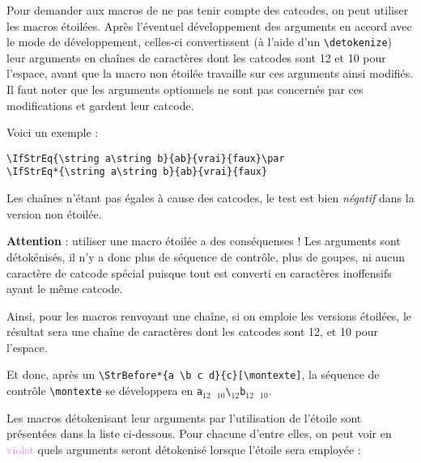 \documentclass[a4paper,10pt]{article}
\newcommand\guill[1]{\og{}#1\fg{}}
\newcommand\styleexercice{\footnotesize}
\newcommand\verbinline{\lstinline[basicstyle=\normalsize\ttfamily]}
\begin{document}
Pour demander aux macros de ne pas tenir compte des catcodes, on peut utiliser les macros étoilées. Après l'éventuel développement des arguments en accord avec le mode de développement, celles-ci convertissent (à l'aide d'un \verb|\detokenize|) leur arguments en chaînes de caractères dont les catcodes sont 12 et 10 pour l'espace, avant que la macro non étoilée travaille sur ces arguments ainsi modifiés. Il faut noter que les arguments optionnels ne sont pas concernés par ces modifications et gardent leur catcode.\smallskip

Voici un exemple :\par\nobreak\smallskip
\begin{minipage}[c]{0.65\linewidth}
\begin{lstlisting}
\IfStrEq{\string a\string b}{ab}{vrai}{faux}\par
\IfStrEq*{\string a\string b}{ab}{vrai}{faux}
\end{lstlisting}%
\end{minipage}\hfill
\begin{minipage}[c]{0.35\linewidth}
	\styleexercice
	\par
\end{minipage}%
\smallskip

Les chaînes n'étant pas égales à cause des catcodes, le test est bien \emph{négatif} dans la version non étoilée.\bigskip

\textbf{Attention} : utiliser une macro étoilée a des conséquenses ! Les arguments sont \guill{détokénisés}, il n'y a donc plus de séquence de contrôle, plus de goupes, ni aucun caractère de catcode spécial puisque tout est converti en caractères \guill{inoffensifs} ayant le même catcode.\medskip

Ainsi, pour les macros renvoyant une chaîne, si on emploie les versions étoilées, le résultat sera une chaîne de caractères dont les catcodes sont 12, et 10 pour l'espace.

Et donc, après un \og\verbinline|\StrBefore*{a \b c d}{c}[\montexte]|\fg{}, la séquence de contrôle \verb|\montexte| se développera en \og{}\verb|a|${}_{12}$\verb*| |${}_{10}$\verb|\|${}_{12}$\verb|b|${}_{12}$\verb*| |${}_{10}$\fg{}.\medskip

Les macros détokenisant leur arguments par l'utilisation de l'étoile sont présentées dans la liste ci-dessous. Pour chacune d'entre elles, on peut voir en \textcolor{violet}{violet} quels arguments seront détokenisé lorsque l'étoile sera employée :
\end{document}

